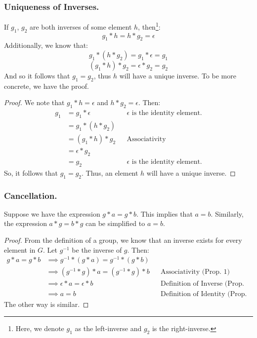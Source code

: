\documentclass[letterpaper]{article}
\begin{document}
\subsubsection{Uniqueness of Inverses.}

If $g_1$, $g_2$ are both inverses of some element $h$, then\footnote{Here, we denote $g_1$ as the left-inverse and $g_2$ is the right-inverse.}:
\[g_1 * h = h * g_2 = \epsilon\]
Additionally, we know that:
\[g_1 * (h * g_2) = g_1 * \epsilon = g_1\]
\[(g_1 * h) * g_2 = \epsilon * g_2 = g_2\]
And so it follows that $g_1 = g_2$, thus $h$ will have a unique inverse. To be more concrete, we have the proof. 
\begin{mdframed}
    \begin{proof}
        We note that $g_1 * h = \epsilon$ and $h * g_2 = \epsilon$. Then:
        \begin{equation*}
            \begin{aligned}
                g_1 &= g_1 * \epsilon && \epsilon \text{ is the identity element.} \\ 
                    &= g_1 * (h * g_2) \\ 
                    &= (g_1 * h) * g_2 && \text{Associativity} \\ 
                    &= \epsilon * g_2 \\ 
                    &= g_2 && \epsilon \text{ is the identity element.}
            \end{aligned}
        \end{equation*}
        So, it follows that $g_1 = g_2$. Thus, an element $h$ will have a unique inverse. 
    \end{proof}
\end{mdframed}

\subsubsection{Cancellation.}
Suppose we have the expression $g * a = g * b$. This implies that $a = b$. Similarly, the expression $a * g = b * g$ can be simplified to $a = b$. 

\begin{mdframed}
    \begin{proof}
        From the definition of a group, we know that an inverse exists for every element in $G$. Let $g^{-1}$ be the inverse of $g$. Then:
        \begin{equation*}
            \begin{aligned}
                g * a = g * b &\implies g^{-1} * (g * a) = g^{-1} * (g * b) \\
                    &\implies (g^{-1} * g) * a = (g^{-1} * g) * b && \text{Associativity (Prop. 1)} \\
                    &\implies \epsilon * a = \epsilon * b && \text{Definition of Inverse (Prop. 3)} \\  
                    &\implies a = b && \text{Definition of Identity (Prop. 2)}
            \end{aligned}
        \end{equation*}
        The other way is similar. 
    \end{proof}
\end{mdframed}
\end{document}
